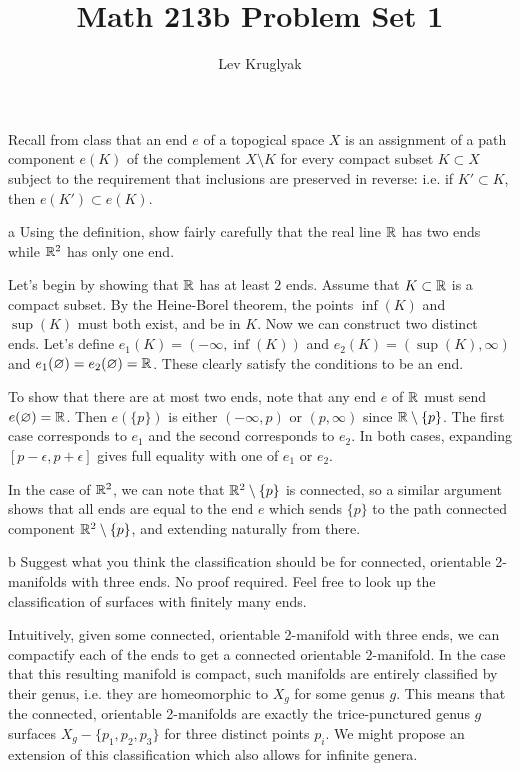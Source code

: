\documentclass{lkx_pset}
\title{Math 213b Problem Set 1}
\author{Lev Kruglyak}
\begin{document}
\maketitle
\collaborators

\begin{problem}{1}
  Recall from class that an end $e$ of a topogical space $X$ is an assignment of a path component $e(K)$ of the complement $X\setminus K$ for every compact subset $K\subset X$ subject to the requirement that inclusions are preserved in reverse: i.e. if $K'\subset K$, then $e(K')\subset e(K)$.
\end{problem}

\begin{parts}
  \begin{part}{a}
    Using the definition, show fairly carefully that the real line $\mathbb{R}$ has two ends while $\mathbb{R}^2$ has only one end.
  \end{part}

  Let's begin by showing that $\mathbb{R}$ has at least $2$ ends. Assume that $K\subset \mathbb{R}$ is a compact subset. By the Heine-Borel theorem, the points $\inf(K)$ and $\sup(K)$ must both exist, and be in $K$. Now we can construct two distinct ends. Let's define $e_1(K) = (-\infty, \inf(K))$ and $e_2(K) = (\sup(K), \infty)$ and $e_1(\varnothing) = e_2(\varnothing)=\mathbb{R}$. These clearly satisfy the conditions to be an end.

  To show that there are at most two ends, note that any end $e$ of $\mathbb{R}$ must send $e(\varnothing) = \mathbb{R}$. Then $e(\{p\})$ is either $(-\infty, p)$ or $(p, \infty)$ since $\mathbb{R}\setminus \{p\}$. The first case corresponds to $e_1$ and the second corresponds to $e_2$. In both cases, expanding $[p-\epsilon, p+\epsilon]$ gives full equality with one of $e_1$ or $e_2$.

  In the case of $\mathbb{R}^2$, we can note that $\mathbb{R}^2\setminus \{p\}$ is connected, so a similar argument shows that all ends are equal to the end $e$ which sends $\{p\}$ to the path connected component $\mathbb{R}^2\setminus \{p\}$, and extending naturally from there.

  \begin{part}{b}
    Suggest what you think the classification should be for connected, orientable
    2-manifolds with three ends. No proof required. Feel free to look up the classification of surfaces with finitely many ends.
  \end{part}

  Intuitively, given some connected, orientable 2-manifold with three ends, we can compactify each of the ends to get a connected orientable $2$-manifold. In the case that this resulting manifold is compact, such manifolds are entirely classified by their genus, i.e. they are homeomorphic to $X_g$ for some genus $g$. This means that the connected, orientable 2-manifolds are exactly the trice-punctured genus $g$ surfaces $X_g - \{p_1, p_2, p_3\}$ for three distinct points $p_i$. We might propose an extension of this classification which also allows for infinite genera.
\end{parts}
\end{document}
